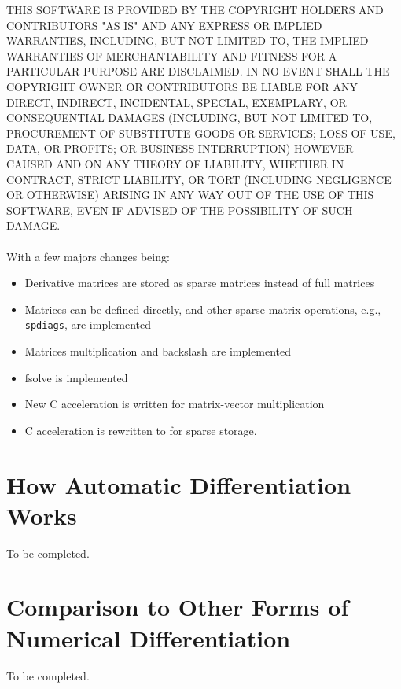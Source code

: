 \documentclass{amsart}
\begin{document}
THIS SOFTWARE IS PROVIDED BY THE COPYRIGHT HOLDERS AND CONTRIBUTORS "AS IS" AND ANY EXPRESS OR IMPLIED WARRANTIES, INCLUDING, BUT NOT LIMITED TO, THE IMPLIED WARRANTIES OF MERCHANTABILITY AND FITNESS FOR A PARTICULAR PURPOSE ARE DISCLAIMED. IN NO EVENT SHALL THE COPYRIGHT OWNER OR CONTRIBUTORS BE LIABLE FOR ANY DIRECT, INDIRECT, INCIDENTAL, SPECIAL, EXEMPLARY, OR CONSEQUENTIAL DAMAGES (INCLUDING, BUT NOT LIMITED TO, PROCUREMENT OF SUBSTITUTE GOODS OR SERVICES; LOSS OF USE, DATA, OR PROFITS; OR BUSINESS INTERRUPTION) HOWEVER CAUSED AND ON ANY THEORY OF LIABILITY, WHETHER IN CONTRACT, STRICT LIABILITY, OR TORT (INCLUDING NEGLIGENCE OR OTHERWISE) ARISING IN ANY WAY OUT OF THE USE OF THIS SOFTWARE, EVEN IF ADVISED OF THE POSSIBILITY OF SUCH DAMAGE.\\
\\

 With a few majors changes being:
\begin{itemize}
\item Derivative matrices are stored as sparse matrices instead of full matrices
\item Matrices can be defined directly, and other sparse matrix operations, e.g., \texttt{spdiags}, are implemented
\item Matrices multiplication and backslash are implemented
\item fsolve is implemented
\item New C acceleration is written for matrix-vector multiplication
\item C acceleration is rewritten to for sparse storage.
\end{itemize}

\section{How Automatic Differentiation Works}
To be completed.

\section{Comparison to Other Forms of Numerical Differentiation}\label{comparison}
To be completed.
\end{document}
